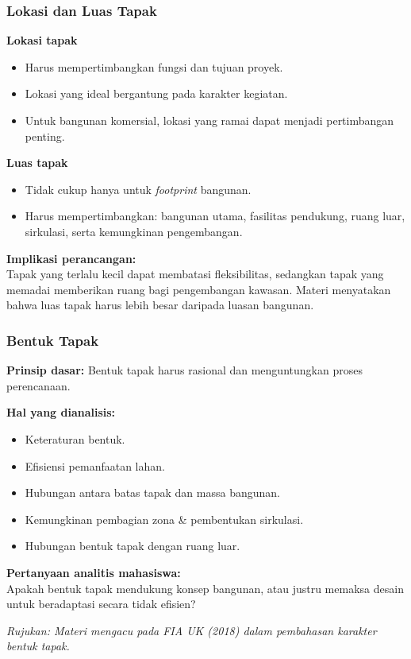 \documentclass[../main.tex]{subfiles}
\begin{document}
\begin{frame}[mytitle=standard, t, mycolor=digiPH_cream, light]
	\frametitle{Lokasi dan Luas Tapak}

	\textbf{Lokasi tapak}
	\begin{itemize}
		\item Harus mempertimbangkan fungsi dan tujuan proyek.
		\item Lokasi yang ideal bergantung pada karakter kegiatan.
		\item Untuk bangunan komersial, lokasi yang ramai dapat menjadi pertimbangan penting.
	\end{itemize}

	\textbf{Luas tapak}
	\begin{itemize}
		\item Tidak cukup hanya untuk \textit{footprint} bangunan.
		\item Harus mempertimbangkan: bangunan utama, fasilitas pendukung, ruang luar, sirkulasi, serta kemungkinan pengembangan.
	\end{itemize}

	\vspace{0.3cm}
	\textbf{Implikasi perancangan:}\\
	Tapak yang terlalu kecil dapat membatasi fleksibilitas, sedangkan tapak yang memadai memberikan ruang bagi pengembangan kawasan. Materi menyatakan bahwa luas tapak harus lebih besar daripada luasan bangunan.
\end{frame}

\begin{frame}[mytitle=standard, t, mycolor=digiPH_white, light]
	\frametitle{Bentuk Tapak}

	\textbf{Prinsip dasar:} Bentuk tapak harus rasional dan menguntungkan proses perencanaan.

	\vspace{0.3cm}
	\textbf{Hal yang dianalisis:}
	\begin{itemize}
		\item Keteraturan bentuk.
		\item Efisiensi pemanfaatan lahan.
		\item Hubungan antara batas tapak dan massa bangunan.
		\item Kemungkinan pembagian zona \& pembentukan sirkulasi.
		\item Hubungan bentuk tapak dengan ruang luar.
	\end{itemize}

	\vspace{0.3cm}
	\textbf{Pertanyaan analitis mahasiswa:}\\
	Apakah bentuk tapak mendukung konsep bangunan, atau justru memaksa desain untuk beradaptasi secara tidak efisien?

	\vspace{0.2cm}
	\footnotesize{\textit{Rujukan: Materi mengacu pada FIA UK (2018) dalam pembahasan karakter bentuk tapak.}}
\end{frame}
\end{document}
